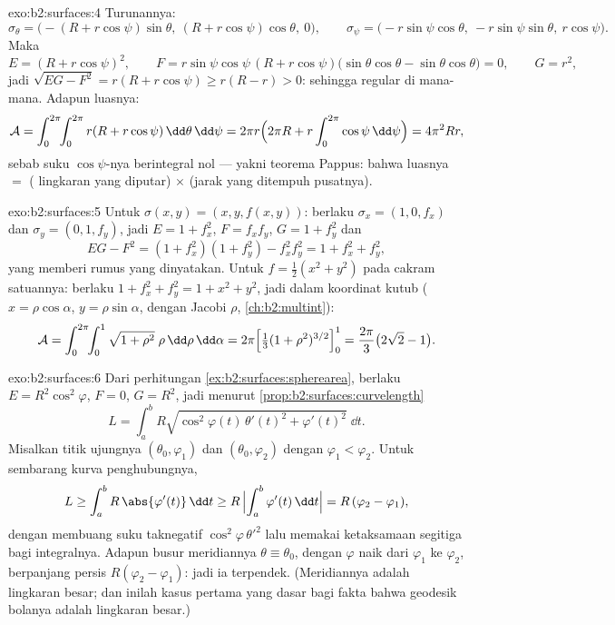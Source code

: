 \begin{solution}{exo:b2:surfaces:4}
Turunannya:
\[
\sigma_\theta = \bigl(-(R + r\cos\psi)\sin\theta,\
(R + r\cos\psi)\cos\theta,\ 0\bigr),
\qquad
\sigma_\psi = \bigl(-r\sin\psi\cos\theta,\
-r\sin\psi\sin\theta,\ r\cos\psi\bigr).
\]
Maka
\[
E = (R + r\cos\psi)^2,
\qquad
F = r\sin\psi\cos\psi\,(R + r\cos\psi)
\bigl(\sin\theta\cos\theta - \sin\theta\cos\theta\bigr) = 0,
\qquad
G = r^2 ,
\]
jadi $\sqrt{EG - F^2} = r(R + r\cos\psi) \geq r(R - r) > 0$:
sehingga regular di mana-mana. Adapun luasnya:
\[
\mathcal{A}
= \int_0^{2\pi}\!\!\int_0^{2\pi} r(R + r\cos\psi)
\,\dd\theta\,\dd\psi
= 2\pi r \Bigl(2\pi R + r\int_0^{2\pi}\cos\psi\,\dd\psi\Bigr)
= 4\pi^2 R r ,
\]
sebab suku $\cos\psi$-nya berintegral nol --- yakni teorema Pappus: bahwa luasnya
$=$ ( lingkaran yang diputar) $\times$ (jarak yang ditempuh
pusatnya).
\end{solution}

\begin{solution}{exo:b2:surfaces:5}
Untuk $\sigma(x, y) = (x, y, f(x,y))$: berlaku $\sigma_x = (1, 0, f_x)$ dan
$\sigma_y = (0, 1, f_y)$, jadi $E = 1 + f_x^2$, $F = f_xf_y$, $G = 1
+ f_y^2$ dan
\[
EG - F^2 = (1 + f_x^2)(1 + f_y^2) - f_x^2f_y^2
= 1 + f_x^2 + f_y^2 ,
\]
yang memberi rumus  yang dinyatakan. Untuk $f = \frac12(x^2 + y^2)$ pada
cakram satuannya: berlaku $1 + f_x^2 + f_y^2 = 1 + x^2 + y^2$, jadi dalam
koordinat kutub ($x = \rho\cos\alpha$, $y = \rho\sin\alpha$, dengan Jacobi
$\rho$, \cref{ch:b2:multint}):
\[
\mathcal{A}
= \int_0^{2\pi}\!\!\int_0^1 \sqrt{1 + \rho^2}\;\rho
\,\dd\rho\,\dd\alpha
= 2\pi\Bigl[\tfrac13(1 + \rho^2)^{3/2}\Bigr]_0^1
= \frac{2\pi}{3}\bigl(2\sqrt2 - 1\bigr).
\]
\end{solution}

\begin{solution}{exo:b2:surfaces:6}
Dari perhitungan \cref{ex:b2:surfaces:spherearea}, berlaku $E =
R^2\cos^2\varphi$, $F = 0$, $G = R^2$, jadi menurut
\cref{prop:b2:surfaces:curvelength}
\[
L = \int_a^b R\sqrt{\cos^2\varphi(t)\,\theta'(t)^2
+ \varphi'(t)^2}\;\dd t .
\]
Misalkan titik ujungnya $(\theta_0, \varphi_1)$ dan $(\theta_0,
\varphi_2)$ dengan $\varphi_1 < \varphi_2$. Untuk sembarang kurva penghubungnya,
\[
L \geq \int_a^b R\,\abs{\varphi'(t)}\,\dd t
\geq R\,\Bigl|\int_a^b \varphi'(t)\,\dd t\Bigr|
= R\,(\varphi_2 - \varphi_1),
\]
dengan membuang suku taknegatif $\cos^2\varphi\,\theta'^2$ lalu memakai
ketaksamaan segitiga bagi integralnya. Adapun busur meridiannya
$\theta \equiv \theta_0$, dengan $\varphi$ naik dari $\varphi_1$ ke
$\varphi_2$, berpanjang persis $R(\varphi_2 - \varphi_1)$: jadi ia
terpendek. (Meridiannya adalah lingkaran besar; dan inilah kasus pertama
yang dasar bagi fakta bahwa geodesik bolanya adalah lingkaran
besar.)
\end{solution}

